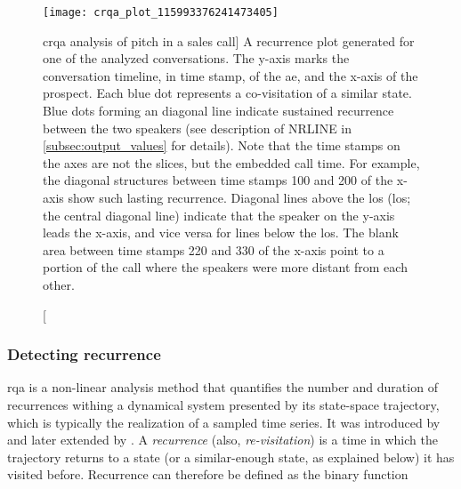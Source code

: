 \begin{figure}[H]
	\centering
	\texttt{[image: crqa\_plot\_115993376241473405]}
	\caption
	[\acs{crqa} analysis of pitch in a sales call]
	{A recurrence plot generated for one of the analyzed conversations.
		The y-axis marks the conversation timeline, in time stamp, of the \ac{ae}, and the x-axis of the prospect.
		Each blue dot represents a co-visitation of a similar state.
		Blue dots forming an diagonal line indicate sustained recurrence between the two speakers (see description of NRLINE in \cref{subsec:output_values} for details).
		Note that the time stamps on the axes are not the slices, but the embedded call time. 
		For example, the diagonal structures between time stamps 100 and 200 of the x-axis show such lasting recurrence.
		Diagonal lines above the \acl{los} (\acs{los}; the central diagonal line) indicate that the speaker on the y-axis leads the x-axis, and vice versa for lines below the \ac{los}.
		The blank area between time stamps 220 and 330 of the x-axis point to a portion of the call where the speakers were more distant from each other.}
	\label{fig:crqa_plot}
\end{figure}

\subsubsection{Detecting recurrence}
\label{subsubsec:detecting_recurrence}

\Ac{rqa} is a non-linear analysis method that quantifies the number and duration of recurrences withing a dynamical system presented by its state-space trajectory, which is typically the realization of a sampled time series.
It was introduced by \citet{Zbilut1992embeddings} and later extended by \citet{Webber2005recurrence, Marwan2002cross}.
A \emph{recurrence} (also, \emph{re-visitation}) is a time in which the trajectory returns to a state (or a similar-enough state, as explained below) it has visited before.
Recurrence can therefore be defined as the binary function

